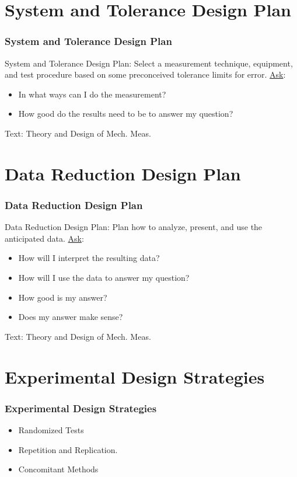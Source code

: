 \documentclass[fleqn]{beamer} %
\newcommand{\sectiontitleII}{System and Tolerance Design Plan}
\newcommand{\sectiontitleIII}{Data Reduction Design Plan}
\newcommand{\sectiontitleIV}{Experimental Design Strategies }
\begin{document}
\section{\sectiontitleII}

\begin{frame}[label=sectionII]
\frametitle{\sectiontitleII}


{\PR System and Tolerance Design Plan}: Select a measurement technique, equipment, and
test procedure based on some preconceived tolerance limits for error. \vspc
\underline{Ask}:
\begin{itemize}
	\item In what ways can I do the measurement?
	\item How good do the results need to be to answer my
	question? 
\end{itemize} 

{\tiny Text: Theory and Design of Mech. Meas.}
\end{frame}

\section{\sectiontitleIII}

\begin{frame}[label=sectionIII]
\frametitle{\sectiontitleIII}

{\GR Data Reduction Design Plan}: Plan how to analyze, present, and use the anticipated data.\vspc
\underline{Ask}:
\begin{itemize}
	\item How will I interpret the resulting data?
	\item How will I use the data to answer my question?
	\item How good is my answer? 
	\item Does my answer make sense?
\end{itemize} 

{\tiny Text: Theory and Design of Mech. Meas.}
\end{frame}

\section{\sectiontitleIV}

\begin{frame}[label=sectionIV]
\frametitle{\sectiontitleIV}


\begin{itemize}
	\item {\BL Randomized} Tests \vspccc%
	\item {\GR Repetition} and {\PR Replication}. \vspccc%
	\item {\BR Concomitant} Methods \vspccc
\end{itemize}

\end{frame}
\end{document}
